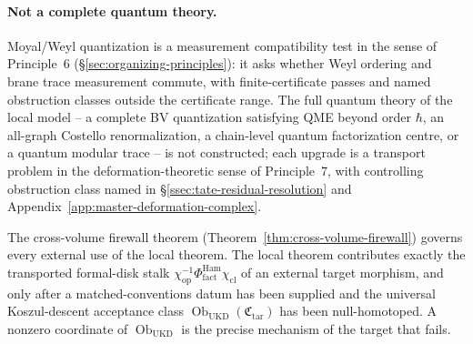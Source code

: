 \paragraph{Not a complete quantum theory.}  Moyal/Weyl quantization is
a measurement compatibility test in the sense of
Principle~6 (\S\ref{sec:organizing-principles}): it asks whether Weyl
ordering and brane trace measurement commute, with finite-certificate
passes and named obstruction classes outside the certificate range.
The full quantum theory of the local model -- a complete BV
quantization satisfying QME beyond order \(\hbar\), an all-graph
Costello renormalization, a chain-level quantum factorization centre,
or a quantum modular trace -- is not constructed; each upgrade is a
transport problem in the deformation-theoretic sense of
Principle~7, with controlling obstruction class named in
\S\ref{ssec:tate-residual-resolution} and Appendix~\ref{app:master-deformation-complex}.

\medskip\noindent
The cross-volume firewall theorem
(Theorem~\ref{thm:cross-volume-firewall}) governs every external use
of the local theorem.  The local theorem contributes exactly the
transported formal-disk stalk
\(\chi_{\mathrm{op}}^{-1}\Phi^{\mathrm{Ham}}_{\mathrm{fact}}\chi_{\mathrm{cl}}\)
of an external target morphism, and only after a matched-conventions
datum has been supplied and the universal Koszul-descent acceptance
class \(\operatorname{Ob}_{\mathrm{UKD}}(\mathfrak C_{\mathrm{tar}})\)
has been null-homotoped.  A nonzero coordinate of
\(\operatorname{Ob}_{\mathrm{UKD}}\) is the precise mechanism of the
target that fails.
